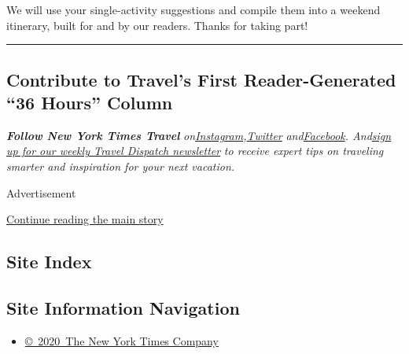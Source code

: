 We will use your single-activity suggestions and compile them into a
weekend itinerary, built for and by our readers. Thanks for taking part!

\begin{center}\rule{0.5\linewidth}{\linethickness}\end{center}

\hypertarget{contribute-to-travels-first-reader-generated-36-hours-column}{%
\subsection{Contribute to Travel's First Reader-Generated ``36 Hours''
Column}\label{contribute-to-travels-first-reader-generated-36-hours-column}}

\emph{\textbf{Follow New York Times Travel}}
\emph{on}\href{https://www.instagram.com/nytimestravel/}{\emph{Instagram}}\emph{,}\href{https://twitter.com/nytimestravel}{\emph{Twitter}}
\emph{and}\href{https://www.facebookcorewwwi.onion/nytimestravel/}{\emph{Facebook}}\emph{.
And}\href{https://www.nytimes3xbfgragh.onion/newsletters/traveldispatch}{\emph{sign
up for our weekly Travel Dispatch newsletter}} \emph{to receive expert
tips on traveling smarter and inspiration for your next vacation.}

Advertisement

\protect\hyperlink{after-bottom}{Continue reading the main story}

\hypertarget{site-index}{%
\subsection{Site Index}\label{site-index}}

\hypertarget{site-information-navigation}{%
\subsection{Site Information
Navigation}\label{site-information-navigation}}

\begin{itemize}
\tightlist
\item
  \href{https://help.nytimes3xbfgragh.onion/hc/en-us/articles/115014792127-Copyright-notice}{©~2020~The
  New York Times Company}
\end{itemize}

